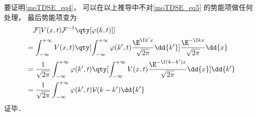 要证明\autoref{moTDSE_eq4}， 可以在以上推导中不对\autoref{moTDSE_eq5} 的势能项做任何处理， 最后势能项变为
\begin{equation}
\begin{aligned}
&\quad\mathcal{F}[V(x, t)\mathcal{F}^{-1}\qty[\varphi(k, t)]]\\
&= \int_{-\infty}^{+\infty}V(x, t) \qty[\int_{-\infty}^{+\infty} \varphi(k', t) \frac{\E^{\I k'x}}{\sqrt{2\pi}} \dd{k'}] \frac{\E^{-\I kx}}{\sqrt{2\pi}} \dd{x}\\
&= \frac{1}{\sqrt{2\pi}}\int_{-\infty}^{+\infty} \varphi(k', t)\qty[\int_{-\infty}^{+\infty} V(x, t) \frac{\E^{-\I (k-k')x}}{\sqrt{2\pi}} \dd{x}] \dd{k'}\\
&= \frac{1}{\sqrt{2\pi}}\int_{-\infty}^{+\infty} \varphi(k', t) \mathcal{V}(k-k')  \dd{k'}
\end{aligned}
\end{equation}
证毕．
